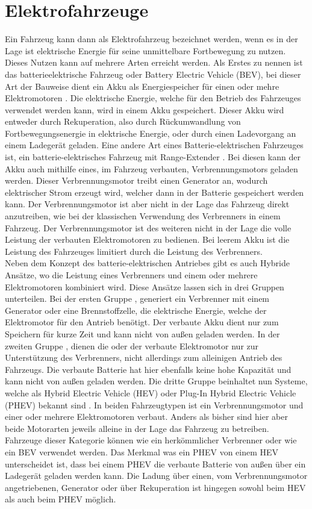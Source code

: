 \section{Elektrofahrzeuge}
Ein Fahrzeug kann dann als Elektrofahrzeug bezeichnet werden, wenn es in der Lage ist elektrische Energie für seine unmittelbare Fortbewegung zu nutzen. Dieses Nutzen kann auf mehrere Arten erreicht werden. Als Erstes zu nennen ist das batterieelektrische Fahrzeug oder Battery Electric Vehicle (BEV), bei dieser Art der Bauweise dient ein Akku als Energiespeicher für einen oder mehre Elektromotoren \cite{e_auto}. Die elektrische Energie, welche für den Betrieb des Fahrzeuges verwendet werden kann,  wird in einem Akku gespeichert. Dieser Akku wird entweder durch Rekuperation, also durch Rückumwandlung von Fortbewegungsenergie in elektrische Energie, oder durch einen Ladevorgang an einem Ladegerät geladen. Eine andere Art eines Batterie-elektrischen Fahrzeuges ist, ein batterie-elektrisches Fahrzeug mit Range-Extender \cite{e_auto}. Bei diesen kann der Akku auch mithilfe eines, im Fahrzeug verbauten, Verbrennungsmotors geladen werden. Dieser Verbrennungsmotor treibt einen Generator an, wodurch elektrischer Strom erzeugt wird, welcher dann in der Batterie gespeichert werden kann. Der Verbrennungsmotor ist aber nicht in der Lage das Fahrzeug direkt anzutreiben, wie bei der klassischen Verwendung des Verbrenners in einem Fahrzeug. Der Verbrennungsmotor ist des weiteren nicht in der Lage die volle Leistung der verbauten Elektromotoren zu bedienen. Bei leerem Akku ist die Leistung des Fahrzeuges limitiert durch die Leistung des Verbrenners. \\
Neben dem Konzept des batterie-elektrischen Antriebes gibt es auch Hybride Ansätze, wo die Leistung eines Verbrenners und einem oder mehrere Elektromotoren kombiniert wird. Diese Ansätze lassen sich in drei Gruppen unterteilen. Bei der ersten Gruppe \cite{e_auto}, generiert ein Verbrenner mit einem Generator oder eine Brennstoffzelle, die elektrische Energie, welche der Elektromotor für den Antrieb benötigt. Der verbaute Akku dient nur zum Speichern für kurze Zeit und kann nicht von außen geladen werden. In der zweiten Gruppe \cite{e_auto}, dienen die oder der verbaute Elektromotor nur zur Unterstützung des Verbrenners, nicht allerdings zum alleinigen Antrieb des Fahrzeugs. Die verbaute Batterie hat hier ebenfalls keine hohe Kapazität und kann nicht von außen geladen werden. Die dritte Gruppe beinhaltet nun Systeme, welche als Hybrid Electric Vehicle (HEV) oder Plug-In Hybrid Electric Vehicle (PHEV) bekannt sind \cite{e_auto}. In beiden Fahrzeugtypen ist ein Verbrennungsmotor und einer oder mehrere Elektromotoren verbaut. Anders als bisher sind hier aber beide Motorarten jeweils alleine in der Lage das Fahrzeug zu betreiben. Fahrzeuge dieser Kategorie können wie ein herkömmlicher Verbrenner oder wie ein BEV verwendet werden. Das Merkmal was ein PHEV von einem HEV unterscheidet ist, dass bei einem PHEV die verbaute Batterie von außen über ein Ladegerät geladen werden kann. Die Ladung über einen, vom Verbrennungsmotor angetriebenen, Generator oder über Rekuperation ist hingegen sowohl beim HEV als auch beim PHEV möglich.\\
